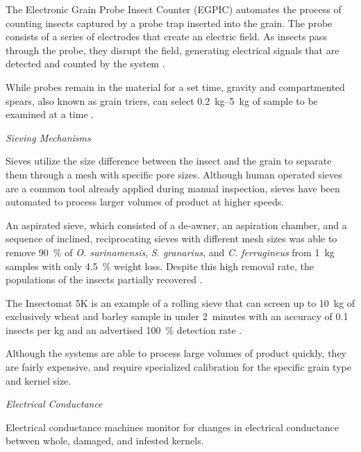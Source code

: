 \documentclass[../Vibro-Acoustic Signatures and Detection Algorithms for Stored Product Insects.tex]{subfiles}
\begin{document}
The Electronic Grain Probe Insect Counter (EGPIC) automates the process of counting insects captured by a probe trap inserted into the grain. The probe consists of a series of electrodes that create an electric field. As insects pass through the probe, they disrupt the field, generating electrical signals that are detected and counted by the system \cite{litzkowElectronicGrainProbe1997, shumanCommercializationElectronicGrain2001}.

While probes remain in the material for a set time, gravity and compartmented spears, also known as grain triers, can select \SIrange{0.2}{5}{\kilo\gram} of sample to be examined at a time \cite{wilkinDetectionInsectsGrain1990,serviceStoredProductManagement1995}.

\textit{Sieving Mechanisms}

Sieves utilize the size difference between the insect and the grain to separate them through a mesh with specific pore sizes. Although human operated sieves are a common tool already applied during manual inspection, sieves have been automated to process larger volumes of product at higher speeds.

An aspirated sieve, which consisted of a de-awner, an aspiration chamber, and a sequence of inclined, reciprocating sieves with different mesh sizes was able to remove \SI{90}{\percent} of \textit{O. surinamensis}, \textit{S. granarius}, and \textit{C. ferrugineus} from \SI{1}{\kilo\gram} samples with only \SI{4.5}{\percent} weight loss. Despite this high removal rate, the populations of the insects partially recovered \cite{armitageUseAspiratedSieve1996}.

The Insectomat 5K is an example of a rolling sieve that can screen up to \SI{10}{\kilo\gram} of exclusively wheat and barley sample in under \SI{2}{minutes} with an accuracy of 0.1 insects per \si{\kilo\gram} and an advertised \SI{100}{\percent} detection rate \cite{Insectomat, robinwilkinComparisonTwoApproaches1996}.

Although the systems are able to process large volumes of product quickly, they are fairly expensive, and require specialized calibration for the specific grain type and kernel size.

\textit{Electrical Conductance}

Electrical conductance machines monitor for changes in electrical conductance between whole, damaged, and infested kernels.
\end{document}
